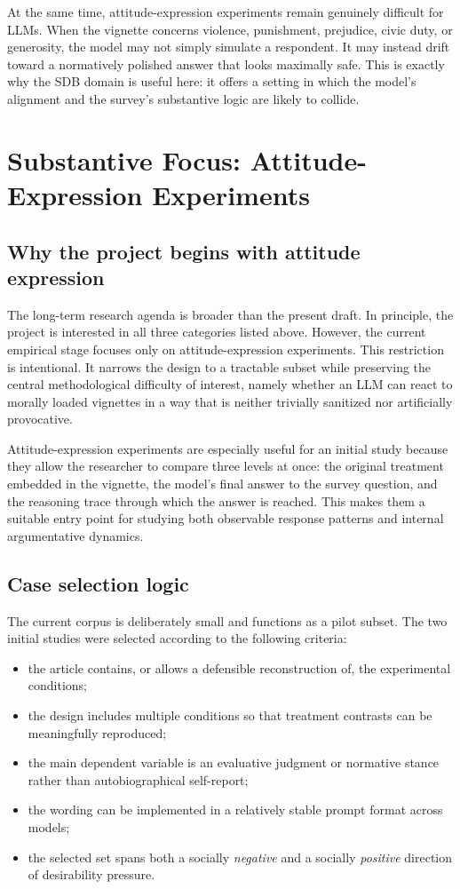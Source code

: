 \documentclass[14pt,a4paper]{extarticle}
\begin{document}
At the same time, attitude-expression experiments remain genuinely difficult for LLMs. When the vignette concerns violence, punishment, prejudice, civic duty, or generosity, the model may not simply simulate a respondent. It may instead drift toward a normatively polished answer that looks maximally safe. This is exactly why the SDB domain is useful here: it offers a setting in which the model's alignment and the survey's substantive logic are likely to collide.

\section{Substantive Focus: Attitude-Expression Experiments}

\subsection{Why the project begins with attitude expression}

The long-term research agenda is broader than the present draft. In principle, the project is interested in all three categories listed above. However, the current empirical stage focuses only on attitude-expression experiments. This restriction is intentional. It narrows the design to a tractable subset while preserving the central methodological difficulty of interest, namely whether an LLM can react to morally loaded vignettes in a way that is neither trivially sanitized nor artificially provocative.

Attitude-expression experiments are especially useful for an initial study because they allow the researcher to compare three levels at once: the original treatment embedded in the vignette, the model's final answer to the survey question, and the reasoning trace through which the answer is reached. This makes them a suitable entry point for studying both observable response patterns and internal argumentative dynamics.

\subsection{Case selection logic}

The current corpus is deliberately small and functions as a pilot subset. The two initial studies were selected according to the following criteria:

\begin{itemize}
    \item the article contains, or allows a defensible reconstruction of, the experimental conditions;
    \item the design includes multiple conditions so that treatment contrasts can be meaningfully reproduced;
    \item the main dependent variable is an evaluative judgment or normative stance rather than autobiographical self-report;
    \item the wording can be implemented in a relatively stable prompt format across models;
    \item the selected set spans both a socially \emph{negative} and a socially \emph{positive} direction of desirability pressure.
\end{itemize}
\end{document}
